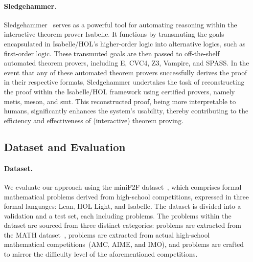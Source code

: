 \documentclass{article}
\begin{document}
\paragraph{Sledgehammer.}
Sledgehammer~\cite{paulsson2012three} serves as a powerful tool for automating reasoning within the interactive theorem prover Isabelle. It functions by transmuting the goals encapsulated in Isabelle/HOL's higher-order logic into alternative logics, such as first-order logic. These transmuted goals are then passed to off-the-shelf automated theorem provers, including E, CVC4, Z3, Vampire, and SPASS. In the event that any of these automated theorem provers successfully derives the proof in their respective formats, Sledgehammer undertakes the task of reconstructing the proof within the Isabelle/HOL framework using certified provers, namely metis, meson, and smt. This reconstructed proof, being more interpretable to humans, significantly enhances the system's usability, thereby contributing to the efficiency and effectiveness of (interactive) theorem proving.

\subsection{Dataset and Evaluation}
\label{sec:evaluation}
\paragraph{Dataset.}
We evaluate our approach using the miniF2F dataset~\cite{zheng2021minif2f}, which comprises  formal mathematical problems derived from high-school competitions, expressed in three formal languages: Lean, HOL-Light, and Isabelle. The dataset is divided into a validation and a test set, each including  problems. The problems within the dataset are sourced from three distinct categories:  problems are extracted from the MATH dataset~\cite{hendrycks2021measuring},  problems are extracted from actual high-school mathematical competitions~(AMC, AIME, and IMO), and  problems are crafted to mirror the difficulty level of the aforementioned competitions.
\end{document}
